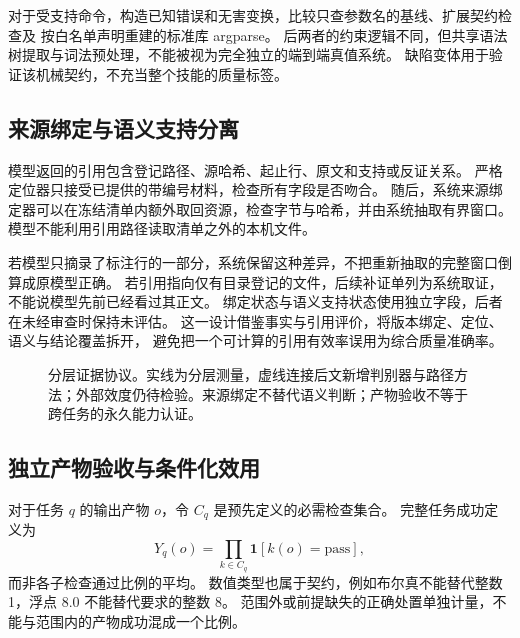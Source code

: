 对于受支持命令，构造已知错误和无害变换，比较只查参数名的基线、扩展契约检查及
按白名单声明重建的标准库 argparse。
后两者的约束逻辑不同，但共享语法树提取与词法预处理，不能被视为完全独立的端到端真值系统。
缺陷变体用于验证该机械契约，不充当整个技能的质量标签。

\subsection{来源绑定与语义支持分离}
模型返回的引用包含登记路径、源哈希、起止行、原文和支持或反证关系。
严格定位器只接受已提供的带编号材料，检查所有字段是否吻合。
随后，系统来源绑定器可以在冻结清单内额外取回资源，检查字节与哈希，并由系统抽取有界窗口。
模型不能利用引用路径读取清单之外的本机文件。

若模型只摘录了标注行的一部分，系统保留这种差异，不把重新抽取的完整窗口倒算成原模型正确。
若引用指向仅有目录登记的文件，后续补证单列为系统取证，不能说模型先前已经看过其正文。
绑定状态与语义支持状态使用独立字段，后者在未经审查时保持未评估。
这一设计借鉴事实与引用评价\citep{P39,P40,P41}，将版本绑定、定位、语义与结论覆盖拆开，
避免把一个可计算的引用有效率误用为综合质量准确率。

\begin{figure}[t]
\centering
{}
\caption{分层证据协议。实线为分层测量，虚线连接后文新增判别器与路径方法；外部效度仍待检验。来源绑定不替代语义判断；产物验收不等于跨任务的永久能力认证。}
\label{fig:protocol}
\end{figure}

\subsection{独立产物验收与条件化效用}
对于任务 $q$ 的输出产物 $o$，令 $C_q$ 是预先定义的必需检查集合。
完整任务成功定义为
\begin{equation}
Y_q(o)=\prod_{k\in C_q}\mathbf{1}[k(o)=\mathrm{pass}],
\label{eq:success}
\end{equation}
而非各子检查通过比例的平均。
数值类型也属于契约，例如布尔真不能替代整数 1，浮点 8.0 不能替代要求的整数 8。
范围外或前提缺失的正确处置单独计量，不能与范围内的产物成功混成一个比例。

